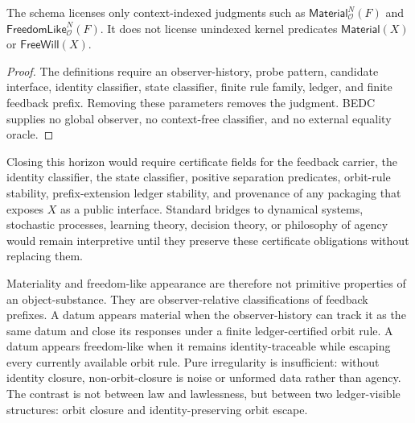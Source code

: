 \begin{corollary}
\label{cor:philosophy-no-context-free-materiality-freewill}
The schema licenses only context-indexed judgments such as
$\mathsf{Material}^N_{\mathcal O}(F)$ and
$\mathsf{FreedomLike}^N_{\mathcal O}(F)$. It does not license
unindexed kernel predicates $\mathsf{Material}(X)$ or
$\mathsf{FreeWill}(X)$.
\end{corollary}
\begin{proof}
The definitions require an observer-history, probe pattern, candidate
interface, identity classifier, state classifier, finite rule family,
ledger, and finite feedback prefix. Removing these parameters removes
the judgment. BEDC supplies no global observer, no context-free
classifier, and no external equality oracle.
\end{proof}

\begin{remark}
\label{rem:philosophy-materiality-roadmap-obligations}
Closing this horizon would require certificate fields for the feedback
carrier, the identity classifier, the state classifier, positive
separation predicates, orbit-rule stability, prefix-extension ledger
stability, and provenance of any packaging that exposes $X$ as a public
interface. Standard bridges to dynamical systems, stochastic
processes, learning theory, decision theory, or philosophy of agency
would remain interpretive until they preserve these certificate
obligations without replacing them.
\end{remark}

Materiality and freedom-like appearance are therefore not primitive
properties of an object-substance. They are observer-relative
classifications of feedback prefixes. A datum appears material when
the observer-history can track it as the same datum and close its
responses under a finite ledger-certified orbit rule. A datum appears
freedom-like when it remains identity-traceable while escaping every
currently available orbit rule. Pure irregularity is insufficient:
without identity closure, non-orbit-closure is noise or unformed data
rather than agency. The contrast is not between law and lawlessness,
but between two ledger-visible structures: orbit closure and
identity-preserving orbit escape.


